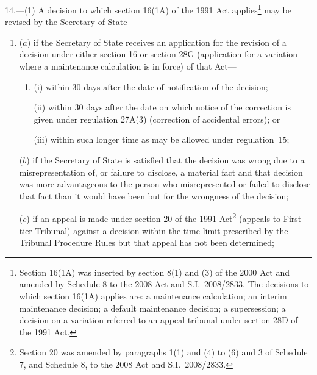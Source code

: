 \documentclass[12pt,a4paper]{article}
\begin{document}
14.---(1)  A decision to which section 16(1A) of the 1991 Act applies\footnote{Section 16(1A) was inserted by section 8(1) and (3) of the 2000 Act and amended by Schedule 8 to the 2008 Act and S.I.~2008/2833. The decisions to which section 16(1A) applies are: a maintenance calculation; an interim maintenance decision; a default maintenance decision; a supersession; a decision on a variation referred to an appeal tribunal under section 28D of the 1991 Act.} may be revised by the Secretary of State—
\begin{enumerate}\item[]
%

($a$) if the Secretary of State receives an application for the revision of a decision under either section 16 or section 28G (application for a variation where a maintenance calculation is in force) of that Act—
\begin{enumerate}\item[]
(i) within 30 days after the date of notification of the decision;

(ii) within 30 days after the date on which notice of the correction is given under regulation 27A(3) (correction of accidental errors); or

(iii) within such longer time as may be allowed under regulation~15;
\end{enumerate}

($b$) if the Secretary of State is satisfied that the decision was wrong due to a misrepresentation of, or failure to disclose, a material fact and that decision was more advantageous to the person who misrepresented or failed to disclose that fact than it would have been but for the wrongness of the decision;

($c$) if an appeal is made under section 20 of the 1991 Act\footnote{Section 20 was amended by paragraphs 1(1) and (4) to (6) and 3 of Schedule 7, and Schedule 8, to the 2008 Act and S.I.~2008/2833.} (appeals to First-tier Tribunal) against a decision within the time limit prescribed by the Tribunal Procedure Rules but that appeal has not been determined;


\end{enumerate}
\end{document}
